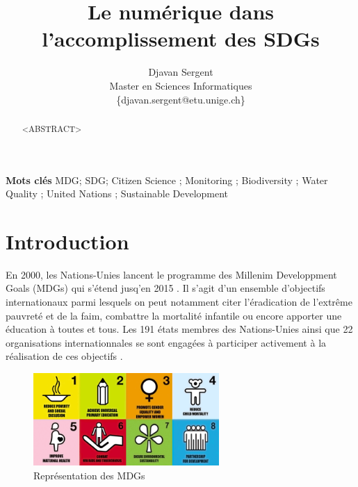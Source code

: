 \documentclass[10pt, conference, compsocconf]{llncs}
\begin{document}
%
\title{Le numérique dans\\l'accomplissement des SDGs}





% 
\author{Djavan Sergent \\
Master en Sciences Informatiques \\
 \{djavan.sergent@etu.unige.ch\}}




\maketitle


\begin{abstract}
	<ABSTRACT>
\end{abstract}


\textbf{Mots clés}
MDG; SDG; Citizen Science ; Monitoring ; Biodiversity ; Water Quality ; United Nations ; Sustainable Development


\section{Introduction}
	En 2000, les Nations-Unies lancent le programme des Millenim Developpment Goals (MDGs) qui s'étend jusq'en 2015 \cite{united_nations_millennium_2009}. Il s'agit d'un ensemble d'objectifs internationaux parmi lesquels on peut notamment citer l'éradication de l'extrême pauvreté et de la faim, combattre la mortalité infantile ou encore apporter une éducation à toutes et tous. Les 191 états membres des Nations-Unies ainsi que 22 organisations internationnales se sont engagées à participer activement à la réalisation de ces objectifs \cite{wikipedia_millennium_2017}.
	\begin{figure}
		\begin{center}
			\includegraphics[width=200pt]{mdgs-full.png}
		\end{center}
		\caption{Représentation des MDGs}
	\end{figure}
	
\end{document}
